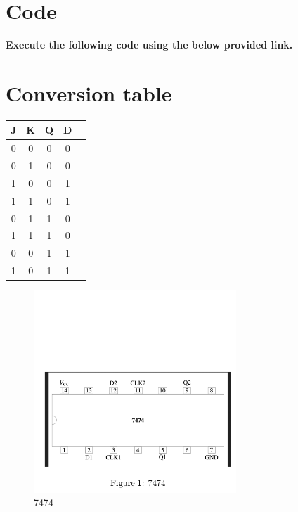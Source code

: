 \documentclass[jornal,10pt,twocolumn]{article}
\begin{document}
\section{Code}
\textbf{Execute the following code using the below provided link.}\\
\begin{center}
\end{center}

\section{Conversion table}

    \centering
    \begin{tabular}{ |c |c |c |c |c |}
\hline
\newline
\textbf{J} & \textbf{K} & \textbf{Q} & \textbf{D} \\
\hline
 0 & 0 & 0 &0 \\  
 0 & 1 & 0 &0 \\ 
 1 & 0 & 0 &1 \\ 
 1 & 1 & 0 &1 \\ 
 0 & 1 & 1 &0 \\ 
 1 & 1 & 1 &0 \\ 
 0 & 0 & 1 &1 \\ 
 1 & 0 & 1 &1 \\ 
 \hline
 \end{tabular}
\label{conversion table}
\begin{figure}
	\centering																	   		
	\includegraphics[width=3in]{IC.png}
	\caption{7474}
	\label{fig:circuit}	
\end{figure}
\end{document}
